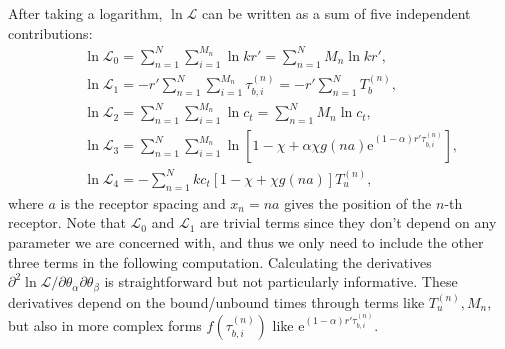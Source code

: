 After taking a logarithm, $\ln\mathcal{L}$ can be written as a sum of five independent contributions:
\begin{eqnarray}
    &&\ln\mathcal{L}_0=\sum_{n=1}^N\sum_{i=1}^{M_n}\ln kr'=\sum_{n=1}^{N}M_n\ln k r',\nonumber\\
    &&\ln\mathcal{L}_1=-r'\sum_{n=1}^N\sum_{i=1}^{M_n}\tau_{b,i}^{(n)}=-r'\sum_{n=1}^NT_b^{(n)},\nonumber\\
    &&\ln\mathcal{L}_2=\sum_{n=1}^N\sum_{i=1}^{M_n}\ln c_t=\sum_{n=1}^N M_n \ln c_t,\label{eq:ch5:log-likelihood}\\
    &&\ln\mathcal{L}_3=\sum_{n=1}^N\sum_{i=1}^{M_n}\ln\left[1-\chi+\alpha\chi g(na)\mathrm{e}^{(1-\alpha)r'\tau_{b,i}^{(n)}}\right],\nonumber\\
    &&\ln\mathcal{L}_4=-\sum_{n=1}^N k c_t\left[1-\chi+\chi g(na)\right]T_u^{(n)},\nonumber
\end{eqnarray}
where $a$ is the receptor spacing and $x_n=na$ gives the position of the $n$-th receptor.
Note that $\mathcal{L}_0$ and $\mathcal{L}_1$ are trivial terms since they don't depend on any parameter we are concerned with, and thus we only need to include the other three terms in the following computation.
Calculating the derivatives $\partial^2\ln\mathcal{L}/\partial\theta_\alpha\partial\theta_\beta$ is straightforward but not particularly informative.
These derivatives depend on the bound/unbound times through terms like $T_u^{(n)}, M_n$, but also in more complex forms $f(\tau_{b,i}^{(n)})$ like $\mathrm{e}^{(1-\alpha)r'\tau_{b,i}^{(n)}}$.

